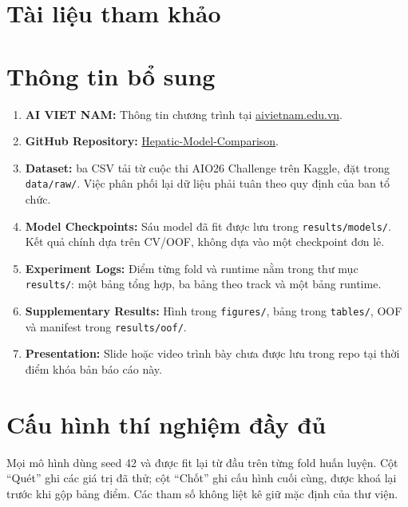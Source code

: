 \documentclass[12pt]{template/ai_conquer2026}
\begin{document}
\newpage
\pagestyle{khongsotrang}
\thispagestyle{khongsotrang}
\section{Tài liệu tham khảo}
\vspace{-3.2em}
\printbibliography

\begin{appendices}
\section{Thông tin bổ sung}
\begin{enumerate}
\item \textbf{AI VIET NAM:} Thông tin chương trình tại
\href{https://aivietnam.edu.vn/}{aivietnam.edu.vn}.
\item \textbf{GitHub Repository:}
\href{https://github.com/AIVIETNAM-AIO-DoHongNhat/Hepatic-Model-Comparison}{Hepatic-Model-Comparison}.
\item \textbf{Dataset:} ba CSV tải từ cuộc thi AIO26 Challenge trên Kaggle, đặt
trong \texttt{data/raw/}. Việc phân phối lại dữ liệu phải tuân theo quy định của
ban tổ chức.
\item \textbf{Model Checkpoints:} Sáu model đã fit được lưu trong
\texttt{results/models/}. Kết quả chính dựa trên CV/OOF, không dựa vào một checkpoint
đơn lẻ.
\item \textbf{Experiment Logs:} Điểm từng fold và runtime nằm trong thư mục
\texttt{results/}: một bảng tổng hợp, ba bảng theo track và một bảng runtime.
\item \textbf{Supplementary Results:} Hình trong \texttt{figures/}, bảng trong
\texttt{tables/}, OOF và manifest trong \texttt{results/oof/}.
\item \textbf{Presentation:} Slide hoặc video trình bày chưa được lưu trong repo
tại thời điểm khóa bản báo cáo này.
\end{enumerate}

\section{Cấu hình thí nghiệm đầy đủ}
\label{app:config}

Mọi mô hình dùng seed 42 và được fit lại từ đầu trên từng fold huấn luyện. Cột
``Quét'' ghi các giá trị đã thử; cột ``Chốt'' ghi cấu hình cuối cùng, được khoá
lại trước khi gộp bảng điểm. Các tham số không liệt kê giữ mặc định của thư viện.


\end{appendices}
\end{document}
